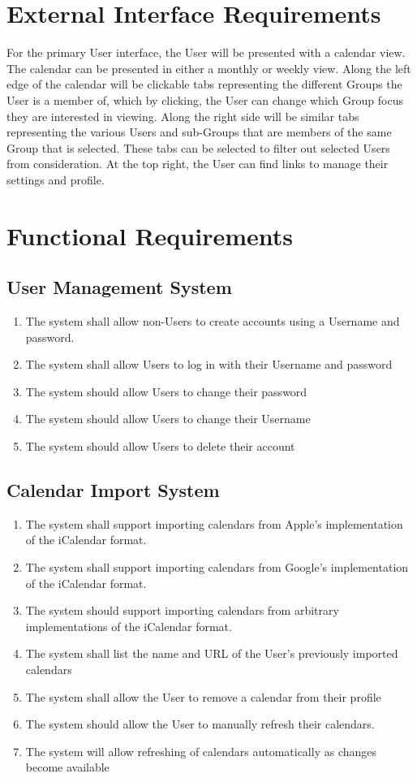 \documentclass{scrreprt}
\begin{document}
\section{External Interface Requirements}
For the primary User interface, the User will be presented with a calendar view.
The calendar can be presented in either a monthly or weekly view. Along the left
edge of the calendar will be clickable tabs representing the different Groups
the User is a member of, which by clicking, the User can change which Group
focus they are interested in viewing. Along the right side will be similar tabs
representing the various Users and sub-Groups that are members of the same
Group that is selected. These tabs can be selected to filter out selected Users
from consideration. At the top right, the User can find links to manage their
settings and profile.
\section{Functional Requirements}

\subsection{User Management System}
    \begin{enumerate}
    \item The system shall allow non-Users to create accounts using a Username and password.
    \item The system shall allow Users to log in with their Username and password
    \item The system should allow Users to change their password
    \item The system should allow Users to change their Username
    \item The system should allow Users to delete their account
    \end{enumerate}

\subsection{Calendar Import System}
    \begin{enumerate}
    \item The system shall support importing calendars from Apple’s implementation of the iCalendar format.
    \item The system shall support importing calendars from Google’s implementation of the iCalendar format.
    \item The system should support importing calendars from arbitrary implementations of the iCalendar format.
    \item The system shall list the name and URL of the User’s previously imported calendars
    \item The system shall allow the User to remove a calendar from their profile
    \item The system should allow the User to manually refresh their calendars.
    \item The system will allow refreshing of calendars automatically as changes become available
    \end{enumerate}
\end{document}
